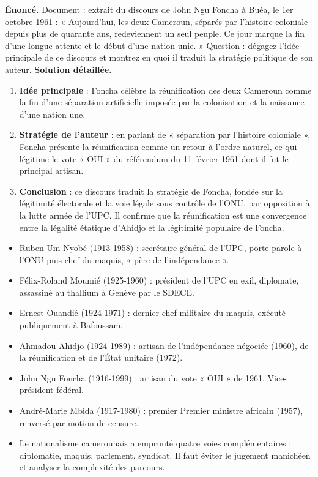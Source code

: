 \documentclass[11pt]{article}
\newcommand{\cle}[1]{{\popxbold\color{popdark}#1}}
\begin{document}
\begin{exoresolu}
\textbf{Énoncé.} Document : extrait du discours de John Ngu Foncha à Buéa, le 1er octobre 1961 : « Aujourd'hui, les deux Cameroun, séparés par l'histoire coloniale depuis plus de quarante ans, redeviennent un seul peuple. Ce jour marque la fin d'une longue attente et le début d'une nation unie. » Question : dégagez l'idée principale de ce discours et montrez en quoi il traduit la stratégie politique de son auteur.
\tcblower
\textbf{Solution détaillée.}
\begin{enumerate}
\item \textbf{Idée principale} : Foncha célèbre la réunification des deux Cameroun comme la fin d'une séparation artificielle imposée par la colonisation et la naissance d'une nation une.
\item \textbf{Stratégie de l'auteur} : en parlant de « séparation par l'histoire coloniale », Foncha présente la réunification comme un retour à l'ordre naturel, ce qui légitime le vote « OUI » du référendum du 11 février 1961 dont il fut le principal artisan.
\item \textbf{Conclusion} : ce discours traduit la stratégie de Foncha, fondée sur la légitimité électorale et la voie légale sous contrôle de l'ONU, par opposition à la lutte armée de l'UPC. Il confirme que la réunification est une convergence entre la légalité étatique d'Ahidjo et la légitimité populaire de Foncha.
\end{enumerate}
\end{exoresolu}

\begin{aretenir}
\begin{itemize}
\item \cle{Ruben Um Nyobé} (1913-1958) : secrétaire général de l'UPC, porte-parole à l'ONU puis chef du maquis, « père de l'indépendance ».
\item \cle{Félix-Roland Moumié} (1925-1960) : président de l'UPC en exil, diplomate, assassiné au thallium à Genève par le SDECE.
\item \cle{Ernest Ouandié} (1924-1971) : dernier chef militaire du maquis, exécuté publiquement à Bafoussam.
\item \cle{Ahmadou Ahidjo} (1924-1989) : artisan de l'indépendance négociée (1960), de la réunification et de l'État unitaire (1972).
\item \cle{John Ngu Foncha} (1916-1999) : artisan du vote « OUI » de 1961, Vice-président fédéral.
\item \cle{André-Marie Mbida} (1917-1980) : premier Premier ministre africain (1957), renversé par motion de censure.
\item Le nationalisme camerounais a emprunté \cle{quatre voies complémentaires} : diplomatie, maquis, parlement, syndicat. Il faut éviter le jugement manichéen et analyser la complexité des parcours.
\end{itemize}
\end{aretenir}
\end{document}
